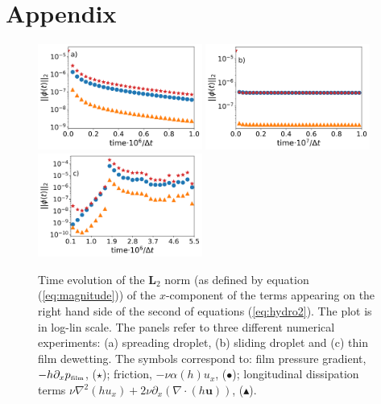 \section{Appendix}\label{sec:app}
\label{app:only}
\begin{figure}
    \centering
    \includegraphics[width=0.48\textwidth]{graphics/Fig_9_1_Relax_drop_term_analysis_second_revision_without_advec_new.png}
    \includegraphics[width=0.48\textwidth]{graphics/Fig_9_2_moving_drop_term_analysis_smaller_drop_theta_5_better.png}
    \includegraphics[width=0.48\textwidth]{graphics/Fig_9_3_dewetting_term_analysis_no_legend_new_without_advec.png}
    \caption{Time evolution of the $\mathbf{L}_2$ norm (as defined by equation (\ref{eq:magnitude})) of the $x$-component of the terms appearing on the right hand side of the second of equations (\ref{eq:hydro2}). 
    The plot is in log-lin scale.
    The panels refer to three different numerical experiments: (a) spreading droplet, (b) sliding droplet and (c) thin film dewetting. 
    The symbols correspond to: film pressure gradient, $-h\partial_x p_{\mbox{\tiny{film}}}$, (\textcolor{pyred}{$\star$}); friction, $-\nu \alpha(h) u_x$, (\textcolor{pyblue}{$\bullet$}); longitudinal dissipation terms $\nu \nabla^2 (h u_x) + 2\nu \partial_x (\nabla \cdot (h\mathbf{u}))$, (\textcolor{pyorange}{$\blacktriangle$}).}
  \label{fig:Referee_1}
\end{figure}

